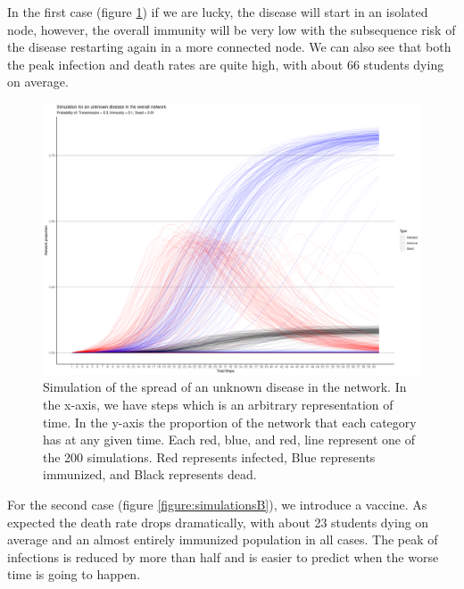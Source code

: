 In the first case (figure \ref{figure:simulationsA}) if we are lucky, the disease will start in an isolated node, however, the overall immunity will be very low with the subsequence risk of the disease restarting again in a more connected node. We can also see that both the peak infection and death rates are quite high, with about 66 students dying on average.

    \begin{figure}[h!]
        \centering
            \includegraphics[width=0.95\linewidth]{figures/Networks/Simulations/Simulation_Nothing.png} 
        \caption{Simulation of the spread of an unknown disease in the network. In the x-axis, we have steps which is an arbitrary representation of time. In the y-axis the proportion of the network that each category has at any given time. Each red, blue, and red, line represent one of the 200 simulations. Red represents infected, Blue represents immunized, and Black represents dead.}
        \label{figure:simulationsA}
    \end{figure}   


For the second case (figure \ref{figure:simulationsB}), we introduce a vaccine. As expected the death rate drops dramatically, with about 23 students dying on average and an almost entirely immunized population in all cases. The peak of infections is reduced by more than half and is easier to predict when the worse time is going to happen.

